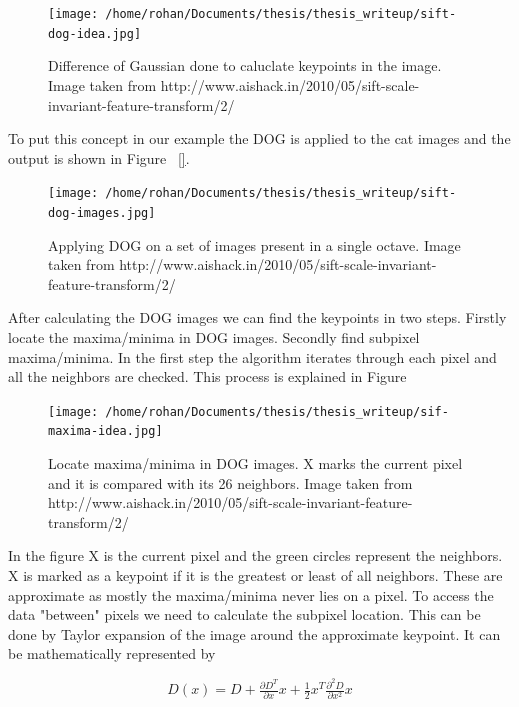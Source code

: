 \documentclass[12pt,draft]{dalcsthesis}
\begin{document}
\begin{figure}
  \centering
     {\texttt{[image: /home/rohan/Documents/thesis/thesis\_writeup/sift-dog-idea.jpg]}}
  \caption{\label{fig- sift dog} Difference of Gaussian done to caluclate keypoints in the image. Image taken from \cite{}{http://www.aishack.in/2010/05/sift-scale-invariant-feature-transform/2/} }
\end{figure}

To put this concept in our example the DOG is applied to the cat images and the output is shown in Figure ~\ref{}. 
\begin{figure}
  \centering
     {\texttt{[image: /home/rohan/Documents/thesis/thesis\_writeup/sift-dog-images.jpg]}}
  \caption{\label{fig- sift dog images} Applying DOG on a set of images present in a single octave. Image taken from \cite{}{http://www.aishack.in/2010/05/sift-scale-invariant-feature-transform/2/} }
\end{figure}

After calculating the DOG images we can find the keypoints in two steps. Firstly locate the maxima/minima in DOG images. Secondly find subpixel maxima/minima. In the first step the algorithm iterates through each pixel and all the neighbors are checked. This process is explained in Figure 

\begin{figure}
  \centering
     {\texttt{[image: /home/rohan/Documents/thesis/thesis\_writeup/sif-maxima-idea.jpg]}}
  \caption{\label{fig- maxima and minima sift octaves} Locate maxima/minima in DOG images. X marks the current pixel and it is compared with its 26 neighbors. Image taken from \cite{}{http://www.aishack.in/2010/05/sift-scale-invariant-feature-transform/2/} }
\end{figure}

In the figure X is the current pixel and the green circles represent the neighbors. X is marked as a keypoint if it is the greatest or least of all neighbors. These are approximate as mostly the maxima/minima never lies on a pixel. To access the data "between" pixels we need to calculate the subpixel location. This can be done by Taylor expansion of the image around the approximate keypoint. It can be mathematically represented by 

\begin{equation}
D(x) = D + \tfrac{\partial D^{T}}{\partial x}x+\tfrac{1}{2}x^{T}\tfrac{\partial^{2} D}{\partial x^{2}}x
\end{equation}
\end{document}
